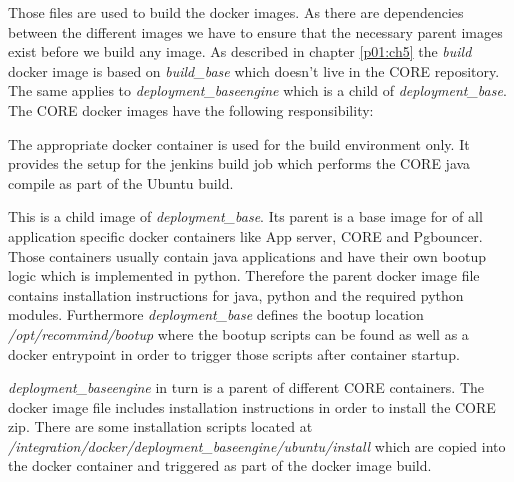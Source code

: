 			Those files are used to build the docker images. As there are dependencies between the different images we have to ensure that the necessary parent images exist before we build any image. As described in chapter \ref{p01:ch5} the \emph{build} docker image is based on \emph{build\_base} which doesn't live in the CORE repository. The same applies to \emph{deployment\_baseengine} which is a child of \emph{deployment\_base}. The CORE docker images have the following responsibility:
			\begin{description}\sloppy
				\item[build] The appropriate docker container is used for the build environment only. It provides the setup for the jenkins build job which performs the CORE java compile as part of the Ubuntu build.
				\item[deployment\_baseengine] This is a child image of \emph{deployment\_base}. Its parent is a base image for of all application specific docker containers like App server, CORE and Pgbouncer. Those containers usually contain java applications and have their own bootup logic which is implemented in python. Therefore the parent docker image file contains installation instructions for java, python and the required python modules. Furthermore \emph{deployment\_base} defines the bootup location \emph{/opt/recommind/bootup} where the bootup scripts can be found as well as a docker entrypoint in order to trigger those scripts after container startup.
				
				\emph{deployment\_baseengine} in turn is a parent of different CORE containers. The docker image file includes installation instructions in order to install the CORE zip. There are some installation scripts located at \emph{/integration/docker/deployment\_baseengine/ubuntu/install} which are copied into the docker container and triggered as part of the docker image build.
				\item[deployment\_ingestionengine]
				\item[deployment\_reviewengine]
				\item[test]
			\end{description}